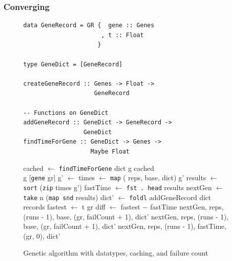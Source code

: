 \documentclass[preprint,nocopyrightspace]{sigplanconf}
\begin{document}
\subsubsection{Converging}
\begin{figure}[t]
\begin{lstlisting}
data GeneRecord = GR {  gene :: Genes
                      , t :: Float
                     }

type GeneDict = [GeneRecord]

createGeneRecord :: Genes -> Float -> 
                    GeneRecord

-- Functions on GeneDict
addGeneRecord :: GeneDict -> GeneRecord -> 
                 GeneDict
findTimeForGene :: GeneDict -> Genes -> 
                   Maybe Float
\end{lstlisting}
\begin{algorithmic}

\State cached $\gets$ \lstinline!findTimeForGene! dict g
\State\Return{}
\EndIf
\State\Return cached
\EndFunction\\

 \State\Return g
 \State\Return $[$\lstinline!gene! gr$]$
\EndIf
\State g' $\gets$ 
\State times $\gets$ \lstinline!map! ( {reps, base, dict}) g'
\State results $\gets$ \lstinline!sort! (\lstinline!zip! times g')
\State fastTime $\gets$ \lstinline!fst . head! results
\State nextGen $\gets$ \lstinline!take! n (\lstinline!map snd! results)
\State dict' $\gets$ \lstinline!foldl! addGeneRecord dict records
\State fastest $\gets$ t gr
\State diff $\gets$ fastest $-$ fastTime
 \State\Return{} {nextGen, reps, (runs - 1), base, (gr, failCount + 1), dict'}
 \State\Return{} {nextGen, reps, (runs - 1), base, (gr, failCount + 1), dict'}
\Else \State\Return{} {nextGen, reps, (runs - 1), fastTime, (gr, 0), dict'}
\EndIf

\EndFunction
\end{algorithmic}
\caption{Genetic algorithm with datatypes, caching, and failure count}
\label{alg:converge}
\end{figure}
\end{document}
